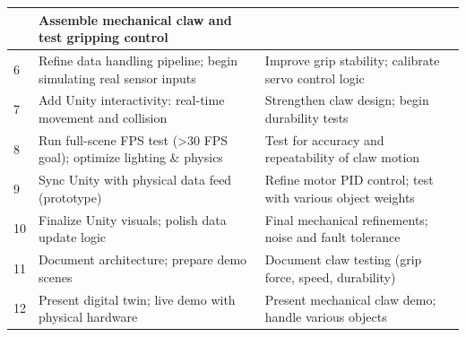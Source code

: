 \documentclass{senior-design}
\begin{document}
\begin{longtable}{|p{}|p{}|p{}|}
    &Assemble mechanical claw and test gripping control 
    \\
    \hline
    6 
    
    &Refine data handling pipeline; begin simulating real sensor inputs 
    
    &Improve grip stability; calibrate servo control logic 
    \\
    \hline
    7 
    
    &Add Unity interactivity: real-time movement and collision 
    
    &Strengthen claw design; begin durability tests 
    \\
    \hline
    8 
    
    &Run full-scene FPS test (>30 FPS goal); optimize lighting \& physics 
    
    &Test for accuracy and repeatability of claw motion 
    \\
    \hline
    9 
    
    &Sync Unity with physical data feed (prototype) 
    
    &Refine motor PID control; test with various object weights 
    \\
    \hline
    10 
    
    &Finalize Unity visuals; polish data update logic 
    
    &Final mechanical refinements; noise and fault tolerance 
    \\
    \hline
    11 
    
    &Document architecture; prepare demo scenes 
    
    &Document claw testing (grip force, speed, durability) 
    \\
    \hline
    12 
    
    &Present digital twin; live demo with physical hardware 
    
    &Present mechanical claw demo; handle various objects 
    \\
    \hline
\end{longtable}
\end{document}

